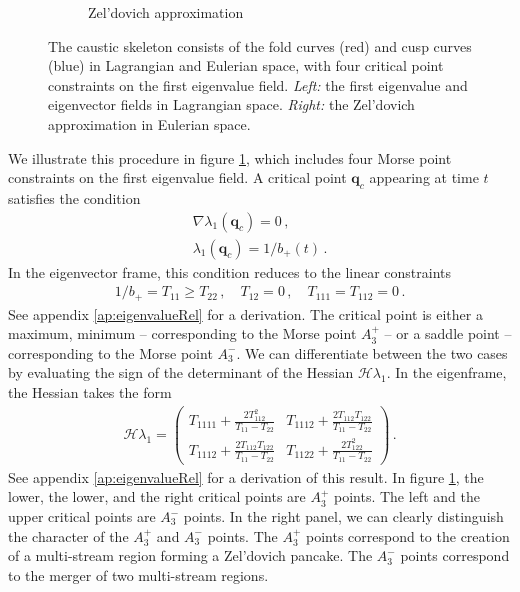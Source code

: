 \documentclass[a4paper, 11pt]{article}
\begin{document}
\begin{figure}
\begin{subfigure}[b]{0.49\textwidth}
\caption{Zel'dovich approximation}
\end{subfigure}
\caption{The caustic skeleton consists of the fold curves (red) and cusp curves (blue) in Lagrangian and Eulerian space, with four critical point constraints on the first eigenvalue field. \textit{Left:} the first eigenvalue and eigenvector fields in Lagrangian space. \textit{Right:} the Zel'dovich approximation in Eulerian space.}\label{fig:composite}
\end{figure}

We illustrate this procedure in figure \ref{fig:composite}, which includes four Morse point constraints on the first eigenvalue field. A critical point $\bm{q}_c$ appearing at time $t$ satisfies the condition
\begin{align}
\nabla \lambda_1(\bm{q}_c) = 0\,,\\
\lambda_1(\bm{q}_c)=1/b_+(t)\,.
\end{align}
In the eigenvector frame, this condition reduces to the linear constraints
\begin{align}
1/b_+ = T_{11} \geq T_{22}\,, \quad  T_{12}=0\,,\quad T_{111}=T_{112}=0\,.
\end{align}
See appendix \ref{ap:eigenvalueRel} for a derivation. The critical point is either a maximum, minimum -- corresponding to the Morse point $A_3^+$ -- or a saddle point -- corresponding to the Morse point $A_3^-$. We can differentiate between the two cases by evaluating the sign of the determinant of the Hessian $\mathcal{H}\lambda_1$. In the eigenframe, the Hessian takes the form
\begin{align}
\mathcal{H}\lambda_1 = 
\begin{pmatrix} 
T_{1111}+\frac{2T_{112}^2}{T_{11}-T_{22}} & T_{1112} + \frac{2 T_{112}T_{122}}{T_{11}-T_{22}} \\
T_{1112}+\frac{2 T_{112}T_{122}}{T_{11}-T_{22}} & T_{1122} + \frac{2 T_{122}^2}{T_{11}-T_{22}}
\end{pmatrix}\,.
\end{align}
See appendix \ref{ap:eigenvalueRel} for a derivation of this result. In figure \ref{fig:composite}, the lower, the lower, and the right critical points are $A_3^+$ points. The left and the upper critical points are $A_3^-$ points. In the right panel, we can clearly distinguish the character of the $A_3^+$ and $A_3^-$ points. The $A_3^+$ points correspond to the creation of a multi-stream region forming a Zel'dovich pancake. The $A_3^-$ points correspond to the merger of two multi-stream regions.
\end{document}
